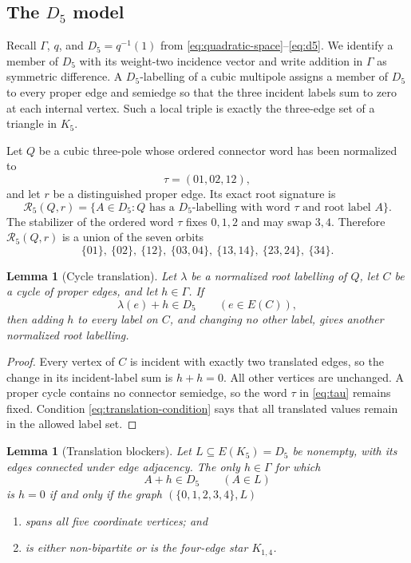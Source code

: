 \documentclass[11pt]{article}
\newtheorem{lemma}[theorem]{Lemma}
\theoremstyle{definition}
\theoremstyle{remark}
\begin{document}
\subsection{The \texorpdfstring{\(D_5\)}{D5} model}

Recall \(\Gamma\), \(q\), and \(D_5=q^{-1}(1)\) from
\eqref{eq:quadratic-space}--\eqref{eq:d5}.  We identify a member of
\(D_5\) with its weight-two incidence vector and write addition in
\(\Gamma\) as symmetric difference.  A
\(D_5\)-labelling of a cubic multipole assigns a member of \(D_5\) to
every proper edge and semiedge so that the three incident labels sum to
zero at each internal vertex.  Such a local triple is exactly the
three-edge set of a triangle in \(K_5\).

Let \(Q\) be a cubic three-pole whose ordered connector word has been
normalized to
\[
 \tau=(01,02,12),                                      \tag{6.1}
 \label{eq:tau}
\]
and let \(r\) be a distinguished proper edge.  Its exact root signature
is
\[
 \mathcal R_5(Q,r)=
 \{A\in D_5:\text{\(Q\) has a \(D_5\)-labelling with word
 \(\tau\) and root label \(A\)}\}.                       \tag{6.2}
\]
The stabilizer of the ordered word \(\tau\) fixes \(0,1,2\) and may
swap \(3,4\).  Therefore \(\mathcal R_5(Q,r)\) is a union of the seven
orbits
\[
 \{01\},\ \{02\},\ \{12\},\
 \{03,04\},\ \{13,14\},\ \{23,24\},\ \{34\}.           \tag{6.3}
\]

\begin{lemma}[Cycle translation]\label{lem:cycle-translation}
Let \(\lambda\) be a normalized root labelling of \(Q\), let \(C\) be
a cycle of proper edges, and let \(h\in\Gamma\).  If
\[
 \lambda(e)+h\in D_5\qquad(e\in E(C)),                  \tag{6.4}
 \label{eq:translation-condition}
\]
then adding \(h\) to every label on \(C\), and changing no other label,
gives another normalized root labelling.
\end{lemma}

\begin{proof}
Every vertex of \(C\) is incident with exactly two translated edges, so
the change in its incident-label sum is \(h+h=0\).  All other vertices
are unchanged.  A proper cycle contains no connector semiedge, so the
word \(\tau\) in \eqref{eq:tau} remains fixed.  Condition
\eqref{eq:translation-condition} says that all translated values remain
in the allowed label set.
\end{proof}

\begin{lemma}[Translation blockers]\label{lem:blockers}
Let \(L\subseteq E(K_5)=D_5\) be nonempty, with its edges connected
under edge adjacency.  The only
\(h\in\Gamma\) for which
\[
 A+h\in D_5\qquad(A\in L)                              \tag{6.5}
 \label{eq:blocker-translation}
\]
is \(h=0\) if and only if the graph
\((\{0,1,2,3,4\},L)\)
\begin{enumerate}[label=(\roman*),leftmargin=2.4em]
\item spans all five coordinate vertices; and
\item is either non-bipartite or is the four-edge star \(K_{1,4}\).
\end{enumerate}
\end{lemma}
\end{document}
